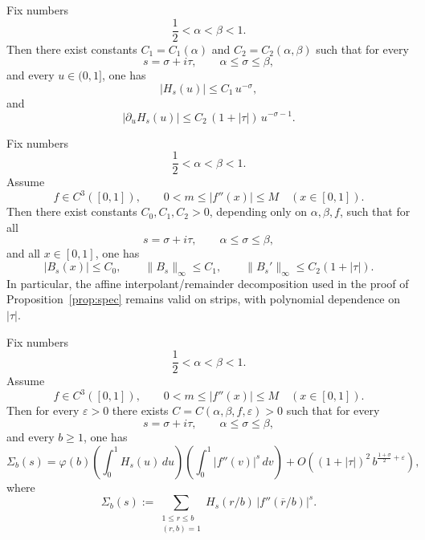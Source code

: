 \documentclass[10pt,a4paper]{amsart}
\begin{document}
\begin{lemma}
\label{lem:Hs-strip}
Fix numbers
\[
\frac12<\alpha<\beta<1.
\]
Then there exist constants \(C_1=C_1(\alpha)\) and \(C_2=C_2(\alpha,\beta)\) such that for every
\[
s=\sigma+i\tau,\qquad \alpha\le \sigma\le \beta,
\]
and every \(u\in(0,1]\), one has
\[
|H_s(u)|\le C_1\,u^{-\sigma},
\]
and
\[
|\partial_u H_s(u)|\le C_2\,(1+|\tau|)\,u^{-\sigma-1}.
\]
\end{lemma}

\begin{lemma}[Strip-uniform bounds for \(B_s(x)=|f''(x)|^s\)]
\label{lem:Bs-strip}
Fix numbers
\[
\frac12<\alpha<\beta<1.
\]
Assume
\[
f\in C^3([0,1]),
\qquad
0<m\le |f''(x)|\le M
\quad (x\in[0,1]).
\]
Then there exist constants \(C_0,C_1,C_2>0\), depending only on \(\alpha,\beta,f\), such that for all
\[
s=\sigma+i\tau,\qquad \alpha\le \sigma\le \beta,
\]
and all \(x\in[0,1]\), one has
\[
|B_s(x)|\le C_0,\qquad \|B_s\|_\infty\le C_1,\qquad \|B_s'\|_\infty\le C_2(1+|\tau|).
\]
In particular, the affine interpolant/remainder decomposition used in the proof of
Proposition~\ref{prop:spec} remains valid on strips, with polynomial dependence on \(|\tau|\).
\end{lemma}

\begin{proposition}
\label{prop:spec-strip}
Fix numbers
\[
\frac12<\alpha<\beta<1.
\]
Assume
\[
f\in C^3([0,1]),
\qquad
0<m\le |f''(x)|\le M
\quad (x\in[0,1]).
\]
Then for every \(\varepsilon>0\) there exists \(C=C(\alpha,\beta,f,\varepsilon)>0\) such that for every
\[
s=\sigma+i\tau,\qquad \alpha\le \sigma\le \beta,
\]
and every \(b\ge1\), one has
\[
\Sigma_b(s)
=
\varphi(b)\left(\int_0^1 H_s(u)\,du\right)\left(\int_0^1 |f''(v)|^s\,dv\right)
+
O\!\left((1+|\tau|)^2\,b^{\frac{1+\sigma}{2}+\varepsilon}\right),
\]
where
\[
\Sigma_b(s):=\sum_{\substack{1\le r\le b\\(r,b)=1}} H_s(r/b)\,|f''(\overline r/b)|^s.
\]
\end{proposition}
\end{document}
